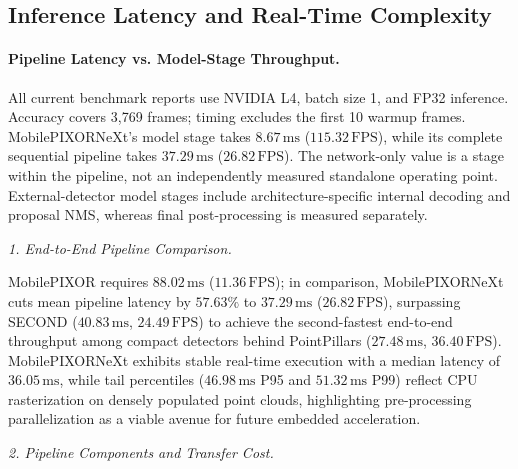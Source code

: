 \subsection{Inference Latency and Real-Time Complexity}
\label{sec:latency_analysis}


\paragraph{Pipeline Latency vs. Model-Stage Throughput.}
All current benchmark reports use NVIDIA L4, batch size 1, and FP32 inference. Accuracy covers 3,769 frames; timing excludes the first 10 warmup frames. MobilePIXORNeXt's model stage takes $8.67\,\text{ms}$ ($115.32\,\text{FPS}$), while its complete sequential pipeline takes $37.29\,\text{ms}$ ($26.82\,\text{FPS}$). The network-only value is a stage within the pipeline, not an independently measured standalone operating point. External-detector model stages include architecture-specific internal decoding and proposal NMS, whereas final post-processing is measured separately.

\textit{1. End-to-End Pipeline Comparison.}

MobilePIXOR requires $88.02\,\text{ms}$ ($11.36\,\text{FPS}$); in comparison, MobilePIXORNeXt cuts mean pipeline latency by $57.63\%$ to $37.29\,\text{ms}$ ($26.82\,\text{FPS}$), surpassing SECOND ($40.83\,\text{ms}$, $24.49\,\text{FPS}$) to achieve the second-fastest end-to-end throughput among compact detectors behind PointPillars ($27.48\,\text{ms}$, $36.40\,\text{FPS}$). MobilePIXORNeXt exhibits stable real-time execution with a median latency of $36.05\,\text{ms}$, while tail percentiles ($46.98\,\text{ms}$ P95 and $51.32\,\text{ms}$ P99) reflect CPU rasterization on densely populated point clouds, highlighting pre-processing parallelization as a viable avenue for future embedded acceleration.

\textit{2. Pipeline Components and Transfer Cost.}

